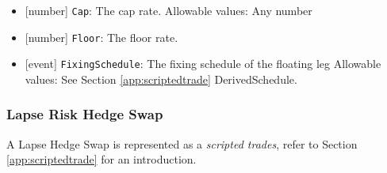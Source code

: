 \begin{itemize}
\item{}[number] \lstinline!Cap!: The cap rate.
  Allowable values: Any number
  \item{}[number] \lstinline!Floor!: The floor rate.
\item{}[event] \lstinline!FixingSchedule!: The fixing schedule of the floating leg
  Allowable values: See Section \ref{app:scriptedtrade} DerivedSchedule.
\end{itemize}

\subsubsection{Lapse Risk Hedge Swap}


A  Lapse Hedge Swap is represented as a {\em scripted trades}, refer to Section
\ref{app:scriptedtrade} for an introduction.

